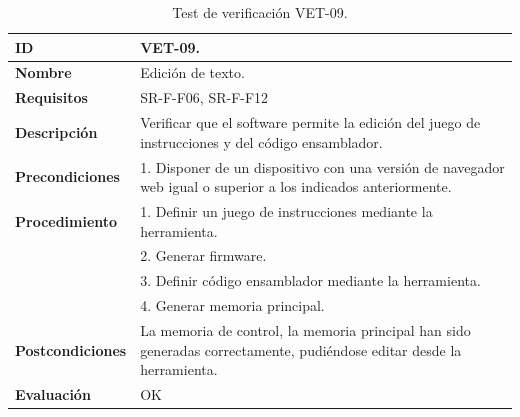 \begin{center}
\begin{table}[htb]
\centering
\begin{tabular}{@{}p{2.5cm} p{13cm}@{}} 
\toprule
\textbf{ID} 					& VET-09. \\
\midrule
\textbf{Nombre} 				& Edición de texto. \\
\midrule
\textbf{Requisitos} 		& SR-F-F06, SR-F-F12\\
\midrule
\textbf{Descripción} 		& Verificar que el software permite la edición del juego de instrucciones y del código ensamblador. \\
\midrule
\textbf{Precondiciones}		& 1. Disponer de un dispositivo con una versión de navegador web igual o superior a los indicados anteriormente. \\
\midrule
\textbf{Procedimiento}		& 1. Definir un juego de instrucciones mediante la herramienta.\\
											& 2. Generar firmware.\\
											& 3. Definir código ensamblador mediante la herramienta.\\
											& 4. Generar memoria principal.\\
\midrule
\textbf{Postcondiciones} 		&  La memoria de control, la memoria principal  han sido generadas correctamente, pudiéndose editar desde la herramienta.\\
\midrule
\textbf{Evaluación} 			& OK \\
\bottomrule
\end{tabular}
\caption{Test de verificación VET-09.}
\label{tab:vet09}
\end{table}
\end{center}


